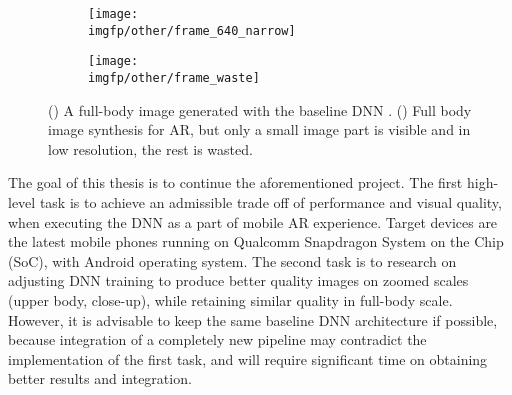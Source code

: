 \begin{figure}[h!]
	\fboxrule=2pt
	\centering
	\begin{subfigure}[b]{0.4\textwidth}
		\centering
		\texttt{[image: \\imgfp/other/frame\_640\_narrow]}
		\caption{}
		\label{intro:fig:stylepeople_frame:640}
	\end{subfigure}
	\hfill
	\begin{subfigure}[b]{0.59\textwidth}
		\centering
		\texttt{[image: \\imgfp/other/frame\_waste]}
		\caption{}
		\label{intro:fig:stylepeople_frame:waste}
	\end{subfigure}

	\caption{(\protect{}) A full-body image generated with the baseline DNN \cite{dnn:stylepeople21}. (\protect{}) Full body image synthesis for AR, but only a small image part is visible and in low resolution, the rest is wasted.}
	\label{intro:fig:stylepeople_frame}
\end{figure}
 
The goal of this thesis is to continue the aforementioned project. The first high-level task is to achieve an admissible trade off of performance and visual quality, when executing the DNN as a part of mobile AR experience. Target devices are the latest mobile phones running on Qualcomm Snapdragon System on the Chip (SoC), with Android operating system. The second task is to research on adjusting DNN training to produce better quality images on zoomed scales (upper body, close-up), while retaining similar quality in full-body scale. However, it is advisable to keep the same baseline \cite{dnn:stylepeople21} DNN architecture if possible, because integration of a completely new pipeline may contradict the implementation of the first task, and will require significant time on obtaining better results and integration.
 
